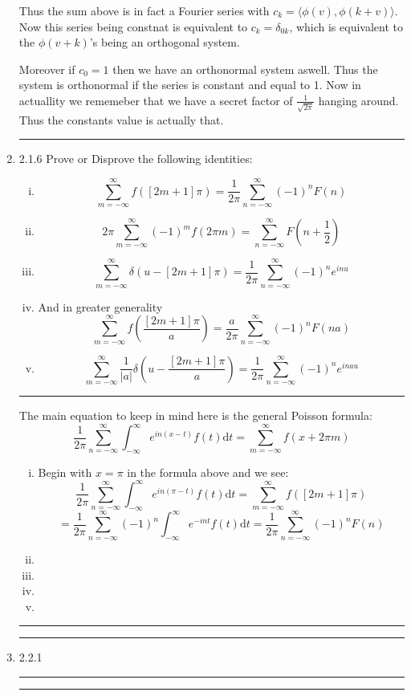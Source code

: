 \documentclass[12pt]{article}
\newcommand{\di}{\mathrm{d}}
\newcommand{\intinf}{\int_{-\infty}^\infty}
\newcommand{\suminf}[1]{\sum_{#1 = -\infty}^\infty}
\theoremstyle{definition}
\begin{document}
\begin{enumerate}
Thus the sum above is in fact a Fourier series with $c_k = 
\langle \phi (v) , \phi (k+v) \rangle $.
Now this series being constnat is equivalent to $c_k = \delta_{0k}$, which is equivalent to the $\phi(v+k)$'s being an orthogonal system.

Moreover if $c_0 =1$ then we have an orthonormal system aswell. Thus the system is orthonormal if the series is constant and equal to 1.
Now in actuallity we rememeber that we have a secret factor of $\frac 1 { \sqrt{ 2 \pi} }$ hanging around. Thus the constants value is actually that.


\hrule
\item 2.1.6
Prove or Disprove the following identities:
\begin{enumerate}[i)]
\item
		\[
	\suminf{m} f( [2m+1] \pi) = \frac 1 {2\pi} \suminf{n} (-1)^n F(n)
		\]
\item
		\[
		2 \pi \suminf{m} (-1)^m f( 2\pi m) = \suminf{n} F(n + \frac 1 2)
		\]
\item
		\[
			\suminf{m} \delta(u- [2m+1] \pi) = \frac 1 {2\pi} \suminf{n} (-1)^n e^{inu}
		\]
\item
	And in greater generality 
		\[
	\suminf{m} f(\frac{ [2m+1] \pi} {a} ) =
		\frac a {2\pi} \suminf{n} (-1)^n F(na)
		\]
\item
		\[
	\suminf{m} \frac 1 {|a|} \delta(u- \frac{[2m+1] \pi} {a}) = \frac 1 {2\pi} \suminf{n} (-1)^n e^{inau}
		\]
\end{enumerate}

\hrule
The main equation to keep in mind here is the general Poisson formula:
\[
	\frac 1 {2 \pi} \suminf{n} \intinf e^{in(x-t)} f(t) \di t = \suminf{m} f(x+ 2 \pi m)
\]
\begin{enumerate}[i)]
	\item
		Begin with $x=\pi$ in the formula above and we see:
\[
	\frac 1 {2 \pi} \suminf{n} \intinf e^{in(\pi -t)} f(t) \di t = \suminf{m} f([2 m+1]\pi )
\]
\[
=	\frac 1 {2 \pi} \suminf{n} (-1)^n \intinf e^{-int} f(t) \di t
		=	\frac 1 {2 \pi} \suminf{n} (-1)^n F(n)
	\]



	\item
	\item
	\item
	\item
\end{enumerate}

\hrule


\hrule
\item 2.2.1
\hrule
\hrule

\end{enumerate}
\end{document}
